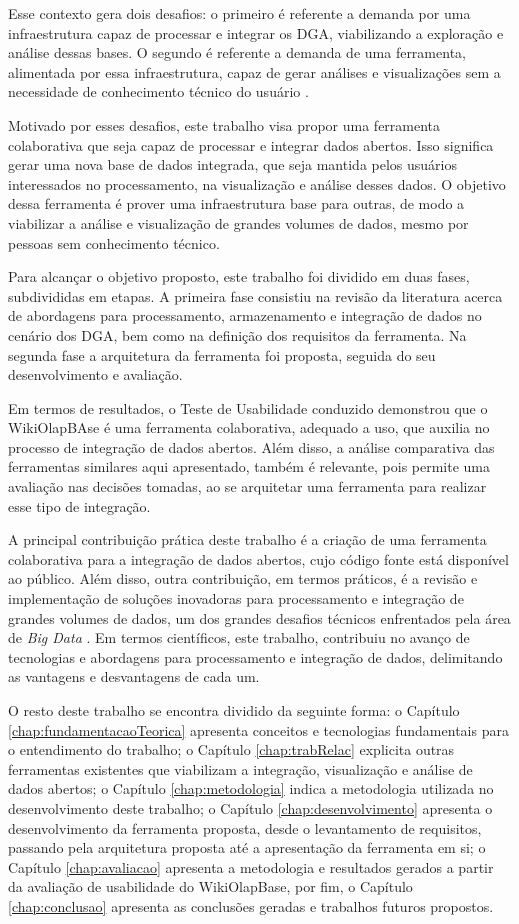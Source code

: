 Esse contexto gera dois desafios: o primeiro é referente a demanda por uma infraestrutura 
capaz de processar e integrar os DGA, viabilizando a exploração e análise dessas bases. 
O segundo é referente a demanda de uma ferramenta, alimentada por essa infraestrutura, capaz 
de gerar análises e visualizações sem a necessidade de conhecimento técnico do usuário 
\cite{graves2013}.

Motivado por esses desafios, este trabalho visa propor uma ferramenta colaborativa que 
seja capaz de processar e integrar dados abertos. Isso significa gerar uma 
nova base de dados integrada, que seja mantida pelos usuários interessados no processamento, 
na visualização e análise desses dados. O objetivo dessa ferramenta é prover uma infraestrutura
base para outras, de modo a viabilizar a análise e visualização de grandes 
volumes de dados, mesmo por pessoas sem conhecimento técnico. 

Para alcançar o objetivo proposto, este trabalho foi dividido em duas fases, subdivididas 
em etapas. A primeira fase consistiu na revisão da literatura acerca de abordagens para 
processamento, armazenamento e integração de dados no cenário dos DGA, bem como na definição 
dos requisitos da ferramenta. Na segunda fase a arquitetura da ferramenta foi proposta, 
seguida do seu desenvolvimento e avaliação.

Em termos de resultados, o Teste de Usabilidade conduzido demonstrou que o WikiOlapBAse é uma
ferramenta colaborativa, adequado a uso, que auxilia no processo de integração de dados 
abertos. Além disso, a análise comparativa das ferramentas similares aqui apresentado, também
é relevante, pois permite uma avaliação nas decisões tomadas, ao se arquitetar uma ferramenta
para realizar esse tipo de integração.

A principal contribuição prática deste trabalho é a criação de uma ferramenta colaborativa para
a integração de dados abertos, cujo código fonte está disponível ao público. Além disso, outra
contribuição, em termos práticos, é a revisão e implementação de soluções inovadoras para
processamento e integração de grandes volumes de dados, um dos grandes desafios técnicos 
enfrentados pela área de \textit{Big Data} \cite{jagadish2014}. Em termos científicos, este
trabalho, contribuiu no avanço de tecnologias e abordagens para processamento e integração
de dados, delimitando as vantagens e desvantagens de cada um.

O resto deste trabalho se encontra dividido da seguinte forma: o Capítulo 
\ref{chap:fundamentacaoTeorica} apresenta conceitos e tecnologias fundamentais para o 
entendimento do trabalho; o Capítulo \ref{chap:trabRelac} explicita outras ferramentas 
existentes que viabilizam a integração, visualização e análise de dados abertos; o 
Capítulo \ref{chap:metodologia} indica a metodologia utilizada no desenvolvimento deste 
trabalho; o Capítulo \ref{chap:desenvolvimento} apresenta o desenvolvimento da ferramenta 
proposta, desde o levantamento de requisitos, passando pela arquitetura proposta até a 
apresentação da ferramenta em si; o Capítulo \ref{chap:avaliacao} apresenta a metodologia e 
resultados gerados a partir da avaliação de usabilidade do WikiOlapBase, por fim, o Capítulo 
\ref{chap:conclusao} apresenta as conclusões geradas e trabalhos futuros propostos.